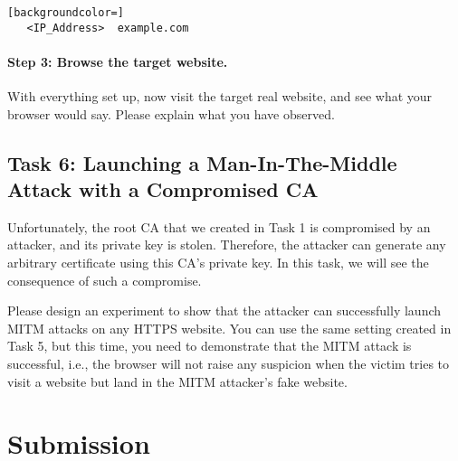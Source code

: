 \begin{lstlisting}[backgroundcolor=]
   <IP_Address>  example.com
\end{lstlisting}


\paragraph{Step 3: Browse the target website.}
With everything set up, now visit the target real website, and 
see what your browser would say. Please explain what you have observed. 




\subsection{Task 6: Launching a Man-In-The-Middle Attack with a Compromised CA}

Unfortunately, the root CA that we created in Task 1 is compromised by an attacker, and its private
key is stolen. Therefore, the attacker can generate any arbitrary certificate 
using this CA's private key. In this task, we will see 
the consequence of such a compromise. 


Please design an experiment to show that the attacker can successfully launch MITM attacks on
any HTTPS website. You can use the same setting created in Task 5, but this time, you need to
demonstrate that the MITM attack is successful, i.e., the browser will not 
raise any suspicion when the victim tries to visit a website but land in the MITM attacker's
fake website.




\section{Submission}

\seedsubmission




